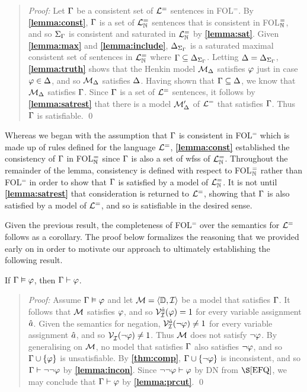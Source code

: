 \begin{quote} 
  \textit{Proof:} 
  Let $\Gamma$ be a consistent set of $\mathcal{L}^{=}$ sentences in FOL$^=$.
  By \textbf{\ref{lemma:const}}, $\Gamma$ is a set of $\mathcal{L}^{=}_{\mathbb{N}}$ sentences that is consistent in FOL$^=_{\mathbb{N}}$, and so $\Sigma_{\Gamma}$ is consistent and saturated in $\mathcal{L}^{=}_{\mathbb{N}}$ by \textbf{\ref{lemma:sat}}. 
  Given \textbf{\ref{lemma:max}} and \textbf{\ref{lemma:include}}, $\Delta_{\Sigma_{\Gamma}}$ is a saturated maximal consistent set of sentences in $\mathcal{L}^{=}_{\mathbb{N}}$ where $\Gamma\subseteq\Delta_{\Sigma_{\Gamma}}$.
  Letting $\Delta=\Delta_{\Sigma_{\Gamma}}$, \textbf{\ref{lemma:truth}} shows that the Henkin model $\mathcal{M}_{\Delta}$ satisfies $\varphi$ just in case $\varphi\in\Delta$, and so $\mathcal{M}_{\Delta}$ satisfies $\Delta$.
  Having shown that $\Gamma\subseteq\Delta$, we know that $\mathcal{M}_{\Delta}$ satisfies $\Gamma$.
  Since $\Gamma$ is a set of $\mathcal{L}^{=}$ sentences, it follows by \textbf{\ref{lemma:satrest}} that there is a model $\mathcal{M}'_{\Delta}$ of $\mathcal{L}^{=}$ that satisfies $\Gamma$.
  Thus $\Gamma$ is satisfiable.
  \qed
\end{quote}

Whereas we began with the assumption that $\Gamma$ is consistent in FOL$^=$ which is made up of rules defined for the language $\mathcal{L}^{=}$, \textbf{\ref{lemma:const}} established the consistency of $\Gamma$ in FOL$^=_{\mathbb{N}}$ since $\Gamma$ is also a set of wfss of $\mathcal{L}^{=}_{\mathbb{N}}$.
Throughout the remainder of the lemma, consistency is defined with respect to FOL$^=_{\mathbb{N}}$ rather than FOL$^=$ in order to show that $\Gamma$ is satisfied by a model of $\mathcal{L}^{=}_{\mathbb{N}}$. 
It is not until \textbf{\ref{lemma:satrest}} that consideration is returned to $\mathcal{L}^{=}$, showing that $\Gamma$ is also satisfied by a model of $\mathcal{L}^{=}$, and so is satisfiable in the desired sense.

Given the previous result, the completeness of FOL$^=$ over the semantics for $\mathcal{L}^{=}$ follows as a corollary. 
The proof below formalizes the reasoning that we provided early on in order to motivate our approach to ultimately establishing the following result.



\begin{Cthm}[\sc FOL$^=$ Completeness] \label{cor:Completeness}
  If $\Gamma\vDash\varphi$, then $\Gamma\vdash\varphi$.
\end{Cthm}

\begin{quote} 
  \textit{Proof:} Assume $\Gamma\vDash\varphi$ and let $\mathcal{M}=\langle\mathbb{D},\mathcal{I}\rangle$ be a model that satisfies $\Gamma$.
  It follows that $\mathcal{M}$ satisfies $\varphi$, and so $\mathcal{V}_{\mathcal{I}}^{\hat{a}}(\varphi)=1$ for every variable assignment $\hat{a}$.
  Given the semantics for negation, $\mathcal{V}_{\mathcal{I}}^{\hat{a}}(\neg\varphi)\neq 1$ for every variable assignment $\hat{a}$, and so $\mathcal{V}_{\mathcal{I}}^{}(\neg\varphi)\neq 1$.
  Thus $\mathcal{M}$ does not satisfy $\neg\varphi$.
  By generalising on $\mathcal{M}$, no model that satisfies $\Gamma$ also satisfies $\neg\varphi$, and so $\Gamma\cup\lbrace\varphi\rbrace$ is unsatisfiable. 
  By \textbf{\ref{thm:comp}}, $\Gamma\cup\lbrace\neg\varphi\rbrace$ is inconsistent, and so $\Gamma\vdash\neg\neg\varphi$ by \textbf{\ref{lemma:incon}}.
  Since $\neg\neg\varphi\vdash\varphi$ by DN from $\S\ref{EFQ}$, we may conclude that $\Gamma\vdash\varphi$ by \textbf{\ref{lemma:prcut}}.
  \qed
\end{quote}

